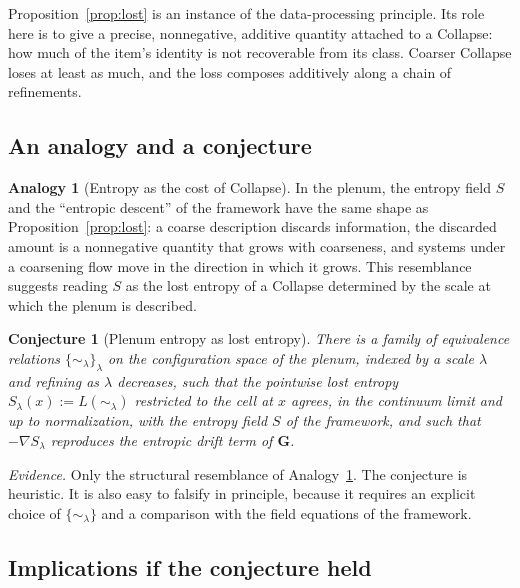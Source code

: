 \documentclass[11pt]{article}
\theoremstyle{definition}
\newtheorem{analogy}[definition]{Analogy}
\theoremstyle{plain}
\newtheorem{conjecture}[definition]{Conjecture}
\theoremstyle{remark}
\begin{document}
Proposition~\ref{prop:lost} is an instance of the data-processing principle. Its role here is to give a precise, nonnegative, additive quantity attached to a Collapse: how much of the item's identity is not recoverable from its class. Coarser Collapse loses at least as much, and the loss composes additively along a chain of refinements.

\subsection{An analogy and a conjecture}

\begin{analogy}[Entropy as the cost of Collapse]\label{an:S}
In the plenum, the entropy field $S$ and the ``entropic descent'' of the framework have the same shape as Proposition~\ref{prop:lost}: a coarse description discards information, the discarded amount is a nonnegative quantity that grows with coarseness, and systems under a coarsening flow move in the direction in which it grows. This resemblance suggests reading $S$ as the lost entropy of a Collapse determined by the scale at which the plenum is described.
\end{analogy}

\begin{conjecture}[Plenum entropy as lost entropy]\label{conj:S}
There is a family of equivalence relations $\{\sim_\lambda\}_\lambda$ on the configuration space of the plenum, indexed by a scale $\lambda$ and refining as $\lambda$ decreases, such that the pointwise lost entropy $S_\lambda(x):=L(\sim_\lambda)$ restricted to the cell at $x$ agrees, in the continuum limit and up to normalization, with the entropy field $S$ of the framework, and such that $-\nabla S_\lambda$ reproduces the entropic drift term of $\mathbf G$.
\end{conjecture}

\emph{Evidence.} Only the structural resemblance of Analogy~\ref{an:S}. The conjecture is heuristic. It is also easy to falsify in principle, because it requires an explicit choice of $\{\sim_\lambda\}$ and a comparison with the field equations of the framework.

\subsection{Implications if the conjecture held}
\end{document}
